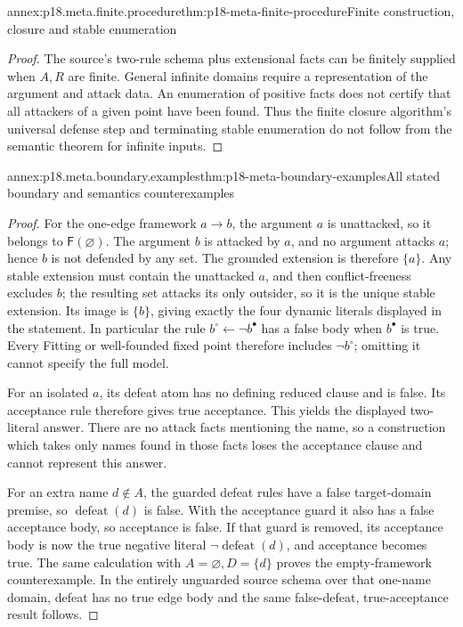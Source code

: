 \begin{annexitem}{annex:p18.meta.finite.procedure}{thm:p18-meta-finite-procedure}{Finite construction, closure and stable enumeration}
\begin{proof}
The source's two-rule schema plus extensional
facts can be finitely supplied when \(A,R\)
are finite. General infinite domains require
a representation of the argument and attack
data. An enumeration of positive facts
does not certify that all attackers of a
given point have been found. Thus the
finite closure algorithm's universal
defense step and terminating stable
enumeration do not follow from the
semantic theorem for infinite inputs.
\end{proof}
\end{annexitem}

\begin{annexitem}{annex:p18.meta.boundary.examples}{thm:p18-meta-boundary-examples}{All stated boundary and semantics counterexamples}
\begin{proof}
For the one-edge framework \(a\to b\), the argument
\(a\) is unattacked, so it belongs to \(\mathsf F(\varnothing)\).
The argument \(b\) is attacked by \(a\), and no argument
attacks \(a\); hence \(b\) is not defended by any set.
The grounded extension is therefore \(\{a\}\).
Any stable extension must contain the unattacked
\(a\), and then conflict-freeness excludes \(b\);
the resulting set attacks its only outsider, so
it is the unique stable extension.
Its image is \(\{b\}\), giving exactly the four
dynamic literals displayed in the statement.
In particular the rule
\(b^\circ\leftarrow\neg b^\bullet\) has a false
body when \(b^\bullet\) is true. Every Fitting
or well-founded fixed point therefore includes
\(\neg b^\circ\); omitting it cannot specify
the full model.

For an isolated \(a\), its defeat atom has no
defining reduced clause and is false. Its
acceptance rule therefore gives true acceptance.
This yields the displayed two-literal answer.
There are no attack facts mentioning the name,
so a construction which takes only names found
in those facts loses the acceptance clause
and cannot represent this answer.

For an extra name \(d\notin A\), the guarded
defeat rules have a false target-domain premise,
so \(\operatorname{defeat}(d)\) is false.
With the acceptance guard it also has a false
acceptance body, so acceptance is false.
If that guard is removed, its acceptance body
is now the true negative literal
\(\neg\operatorname{defeat}(d)\), and acceptance
becomes true. The same calculation with
\(A=\varnothing,D=\{d\}\) proves the empty-framework
counterexample. In the entirely unguarded source
schema over that one-name domain, defeat has no
true edge body and the same false-defeat,
true-acceptance result follows.


\end{proof}
\end{annexitem}
